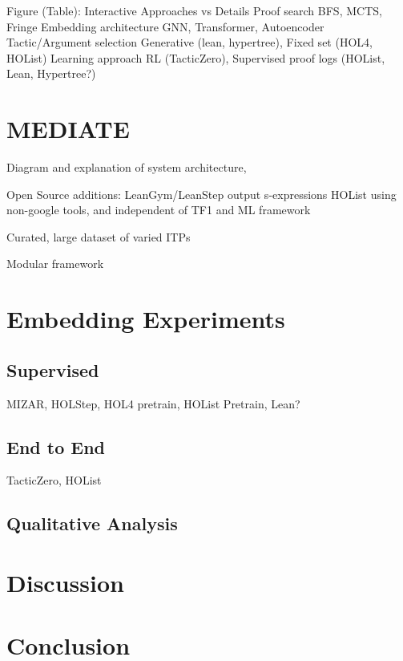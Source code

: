 \documentclass[letterpaper]{article} %
\begin{document}
Figure (Table):
Interactive Approaches vs Details
Proof search
BFS, MCTS, Fringe
Embedding architecture
GNN, Transformer, Autoencoder
Tactic/Argument selection
Generative (lean, hypertree), Fixed set (HOL4, HOList)
Learning approach
RL (TacticZero), Supervised proof logs (HOList, Lean, Hypertree?)

\section{MEDIATE}
Diagram and explanation of system architecture,

Open Source additions:
LeanGym/LeanStep output s-expressions
HOList using non-google tools, and independent of TF1 and ML framework

Curated, large dataset of varied ITPs

Modular framework

\section{Embedding Experiments}
\subsection{Supervised}
MIZAR, HOLStep, HOL4 pretrain, HOList Pretrain, Lean?
\subsection{End to End}
TacticZero, HOList
\subsection{Qualitative Analysis}
\section{Discussion}
\section{Conclusion}
\end{document}
